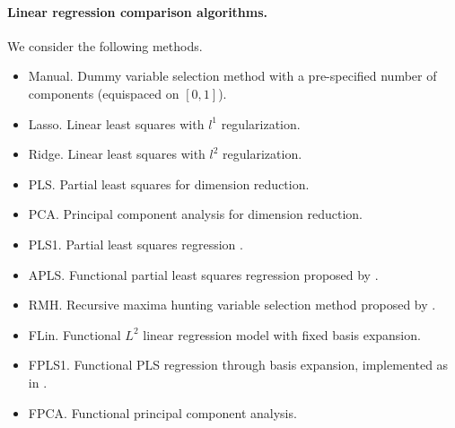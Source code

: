 \paragraph{Linear regression comparison algorithms.} We consider the following methods.
\begin{itemize}
  \item Manual.\hspace{.3em} Dummy variable selection method with a pre-specified number of components (equispaced on \([0, 1]\)).
  \item Lasso.\hspace{.3em} Linear least squares with \(l^1\) regularization.
  \item Ridge.\hspace{.3em} Linear least squares with \(l^2\) regularization.
  \item PLS.\hspace{.3em} Partial least squares for dimension reduction.
  \item PCA.\hspace{.3em} Principal component analysis for dimension reduction.
  \item PLS1.\hspace{.3em} Partial least squares regression \citep[e.g.][]{wegelin2000survey}.
  \item APLS.\hspace{.3em} Functional partial least squares regression proposed by \citet{delaigle2012methodology}.
  \item RMH.\hspace{.3em} Recursive maxima hunting variable selection method proposed by \citet{torrecilla2016feature}.
  \item FLin.\hspace{.3em} Functional \(L^2\) linear regression model with fixed basis expansion.
  \item FPLS1.\hspace{.3em} Functional PLS regression through basis expansion, implemented as in \citet{aguilera2010using}.
  \item FPCA.\hspace{.3em} Functional principal component analysis.
\end{itemize}

